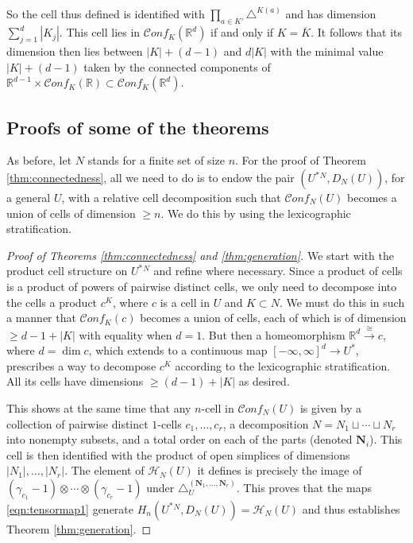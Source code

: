 \documentclass[12pt,letterpaper]{amsart}
\numberwithin{equation}{section}
\def\Nbold{{\mathbf N}}
\def\RR{{\mathbb R}}
\def\g{\gamma}
\def\tri{\triangle}
\def\Hcal{{\mathcal H}}
\newcommand\conf{\mathscr{C}\!\mathit{onf}\!}
\theoremstyle{remark}
\begin{document}
So the cell thus defined is identified with $\prod_{a\in K'} \tri^{K(a)}$ and has dimension $\sum_{j=1}^d |K_j|$. This cell lies in $\conf_K(\RR^d)$ if and only if $K=\overline K$. It follows that its dimension then lies  between  $|K|+(d-1)$ and $d|K|$ with the minimal value
$|K|+(d-1)$  taken by  the connected components of $\RR^{d-1}\times\conf_K(\RR)\subset  \conf_K (\RR^d)$.




\subsection{Proofs  of  some of the theorems}\label{subsec:celldecomposition} {As before, let $N$ stands for a finite set of size $n$.}
For the proof  of Theorem \ref{thm:connectedness}, all we need to do is to endow the pair $(U^*{}^N, D_N(U))$, for a general $U$, with a relative cell decomposition such that $\conf_N(U)$ becomes a union of cells of dimension $\ge n$. We do this by using the lexicographic stratification.

\begin{proof}[Proof of  Theorems \ref{thm:connectedness} and \ref{thm:generation}]
We start with the product cell structure on $U^*{}^N$ and refine where necessary. Since a  product of cells is  a product of powers of pairwise distinct cells, we  only need to decompose into the cells  a  product $c^K$, where 
$c$ is a  cell in $U$ and $K\subset N$. We must do this in such a  manner  that $\conf_K(c)$ becomes a union of cells, each of  which is of dimension $\ge d-1+|K|$ with equality when $d=1$. 
But then a homeomorphism $\RR^d\xrightarrow{\cong} c$, where $d=\dim c$, which extends to a continuous map $[-\infty, \infty]^d\to U^*$, prescribes a way to decompose $c^K$ according to the lexicographic stratification. All its cells have dimensions  $\ge (d-1)+|K|$ as desired.

This shows at the same time that any $n$-cell in $\conf_N(U)$ is given by a collection of pairwise distinct $1$-cells $c_1, \dots, c_r$, a decomposition 
$N=N_1\sqcup \cdots \sqcup N_r$ into nonempty subsets, and a total order on each of the parts (denoted $\Nbold_i$). This cell is then identified with  
the product of open  simplices of dimensions $|N_1|, \dots, |N_r|$. The element of $\Hcal_N(U)$ it defines is precisely the image of 
$(\g_{c_1}-1)\otimes\cdots \otimes (\g_{c_r}-1)$ under 
$\tri_U^{(\Nbold_1, \dots,\Nbold_r)}$. This proves  that the maps \eqref{eqn:tensormap1} generate $ H_n(U^*{}^N, D_N(U))=\Hcal_N(U)$ and thus establishes Theorem \ref{thm:generation}.
\end{proof}
\end{document}
